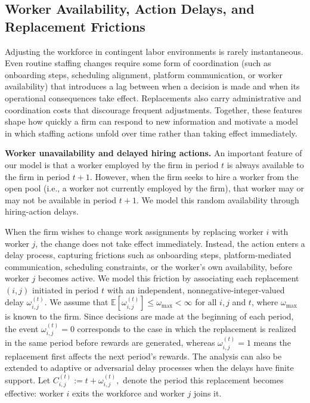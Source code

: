 \documentclass[opre,blindrev]{informs3}
\newcommand{\bE}[1]{{\mathbb{E}\left[#1\right]}}
\begin{document}
\vspace{-.1in}
\subsection{Worker Availability, Action Delays, and Replacement Frictions}
Adjusting the workforce in contingent labor environments is rarely instantaneous. Even routine staffing changes require some form of coordination (such as onboarding steps, scheduling alignment, platform communication, or worker availability) that introduces a lag between when a decision is made and when its operational consequences take effect. Replacements also carry administrative and coordination costs that discourage frequent adjustments. Together, these features shape how quickly a firm can respond to new information and motivate a model in which staffing actions unfold over time rather than taking effect immediately.

{\bf Worker unavailability and delayed hiring actions.}
An important feature of our model is that a worker employed by the firm in period \(t\) is always available to the firm in period \(t+1\). However, when the firm seeks to hire a worker from the open pool (i.e., a worker not currently employed by the firm), that worker may or may not be available in period \(t+1\). We model this random availability through hiring-action delays.  

When the firm wishes to change work assignments by replacing worker \(i\) with worker \(j\), the change does not take effect immediately. Instead, the action enters a delay process, capturing frictions such as onboarding steps, platform-mediated communication, scheduling constraints, or the worker's own availability, before worker \(j\) becomes active. We model this friction by associating each replacement \((i,j)\) initiated in period \(t\) with an independent, nonnegative-integer-valued delay \(\omega_{i,j}^{(t)}\). We assume that \(\bE{\omega_{i,j}^{(t)}} \le \omega_{\max} < \infty\) for all \(i,j\) and \(t\), where \(\omega_{\max}\) is known to the firm. Since decisions are made at the beginning of each period, the event \(\omega_{i,j}^{(t)}=0\) corresponds to the case in which the replacement is realized in the same period before rewards are generated, whereas \(\omega_{i,j}^{(t)}=1\) means the replacement first affects the next period's rewards. The analysis can also be extended to adaptive or adversarial delay processes when the delays have finite support.
Let \(C_{i,j}^{(t)} := t + \omega_{i,j}^{(t)},\) denote the period this replacement becomes effective: worker \(i\) exits the workforce and worker \(j\) joins it.
\end{document}
